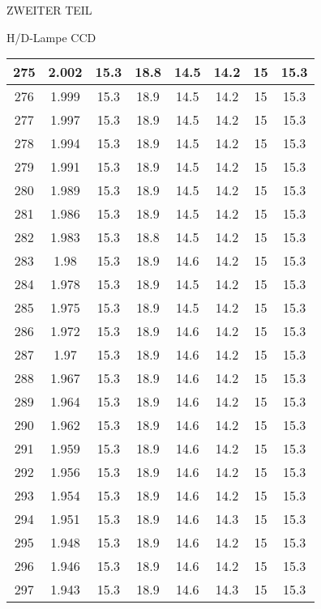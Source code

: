 \begin{appendix}
\begin{chapter}{ZWEITER TEIL}
\begin{section}{H/D-Lampe CCD}
\begin{scriptsize}
\begin{longtable}[htbp]{|c|c|c|c|c|c|c|c|}
            275 & 2.002 & 15.3 & 18.8 & 14.5 & 14.2 & 15 & 15.3 \\ \hline
            276 & 1.999 & 15.3 & 18.9 & 14.5 & 14.2 & 15 & 15.3 \\ \hline
            277 & 1.997 & 15.3 & 18.9 & 14.5 & 14.2 & 15 & 15.3 \\ \hline
            278 & 1.994 & 15.3 & 18.9 & 14.5 & 14.2 & 15 & 15.3 \\ \hline
            279 & 1.991 & 15.3 & 18.9 & 14.5 & 14.2 & 15 & 15.3 \\ \hline
            280 & 1.989 & 15.3 & 18.9 & 14.5 & 14.2 & 15 & 15.3 \\ \hline
            281 & 1.986 & 15.3 & 18.9 & 14.5 & 14.2 & 15 & 15.3 \\ \hline
            282 & 1.983 & 15.3 & 18.8 & 14.5 & 14.2 & 15 & 15.3 \\ \hline
            283 & 1.98 & 15.3 & 18.9 & 14.6 & 14.2 & 15 & 15.3 \\ \hline
            284 & 1.978 & 15.3 & 18.9 & 14.5 & 14.2 & 15 & 15.3 \\ \hline
            285 & 1.975 & 15.3 & 18.9 & 14.5 & 14.2 & 15 & 15.3 \\ \hline
            286 & 1.972 & 15.3 & 18.9 & 14.6 & 14.2 & 15 & 15.3 \\ \hline
            287 & 1.97 & 15.3 & 18.9 & 14.6 & 14.2 & 15 & 15.3 \\ \hline
            288 & 1.967 & 15.3 & 18.9 & 14.6 & 14.2 & 15 & 15.3 \\ \hline
            289 & 1.964 & 15.3 & 18.9 & 14.6 & 14.2 & 15 & 15.3 \\ \hline
            290 & 1.962 & 15.3 & 18.9 & 14.6 & 14.2 & 15 & 15.3 \\ \hline
            291 & 1.959 & 15.3 & 18.9 & 14.6 & 14.2 & 15 & 15.3 \\ \hline
            292 & 1.956 & 15.3 & 18.9 & 14.6 & 14.2 & 15 & 15.3 \\ \hline
            293 & 1.954 & 15.3 & 18.9 & 14.6 & 14.2 & 15 & 15.3 \\ \hline
            294 & 1.951 & 15.3 & 18.9 & 14.6 & 14.3 & 15 & 15.3 \\ \hline
            295 & 1.948 & 15.3 & 18.9 & 14.6 & 14.2 & 15 & 15.3 \\ \hline
            296 & 1.946 & 15.3 & 18.9 & 14.6 & 14.2 & 15 & 15.3 \\ \hline
            297 & 1.943 & 15.3 & 18.9 & 14.6 & 14.3 & 15 & 15.3 \\ \hline

\end{longtable}
\end{scriptsize}
\end{section}
\end{chapter}
\end{appendix}
